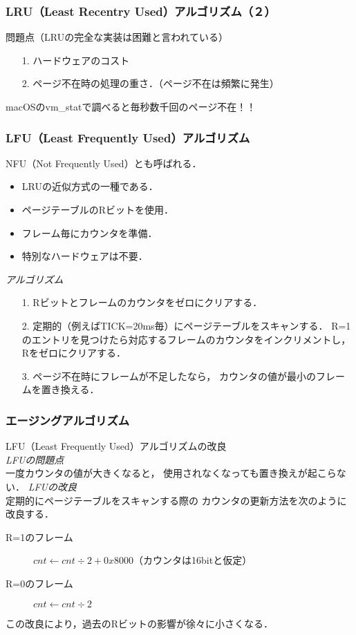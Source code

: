 \documentclass{beamer}                   %
\begin{document}
\begin{frame}
  \frametitle{LRU（Least Recentry Used）アルゴリズム（２）}
  問題点（LRUの完全な実装は困難と言われている）\\
  \begin{enumerate}
  \item[1.] ハードウェアのコスト
  \item[2.] ページ不在時の処理の重さ．（ページ不在は頻繁に発生）
  \end{enumerate}
  macOSのvm\_statで調べると毎秒数千回のページ不在！！
\end{frame}

\begin{frame}
  \frametitle{LFU（Least Frequently Used）アルゴリズム}
  NFU（Not Frequently Used）とも呼ばれる．
  \begin{itemize}
  \item LRUの近似方式の一種である．
  \item ページテーブルのRビットを使用．
  \item フレーム毎にカウンタを準備．
  \item 特別なハードウェアは不要．
  \end{itemize}
  \vfill
  \emph{アルゴリズム}
  \begin{enumerate}
  \item[1.] Rビットとフレームのカウンタをゼロにクリアする．
  \item[2.] 定期的（例えばTICK=20ms毎）にページテーブルをスキャンする．
    R=1のエントリを見つけたら対応するフレームのカウンタをインクリメントし，
    Rをゼロにクリアする．
  \item[3.] ページ不在時にフレームが不足したなら，
    カウンタの値が最小のフレームを置き換える．
  \end{enumerate}
\end{frame}

\begin{frame}
  \frametitle{エージングアルゴリズム}
  LFU（Least Frequently Used）アルゴリズムの改良\\
  \vfill
  \emph{LFUの問題点}\\
  一度カウンタの値が大きくなると，
  使用されなくなっても置き換えが起こらない．
  \vfill
  \emph{LFUの改良}\\
  定期的にページテーブルをスキャンする際の
  カウンタの更新方法を次のように改良する．
  \begin{description}
  \item[R=1のフレーム]
    $cnt \leftarrow cnt \div 2 + 0x8000$（カウンタは16bitと仮定）
  \item[R=0のフレーム]
    $cnt \leftarrow cnt \div 2$
  \end{description}
  この改良により，過去のRビットの影響が徐々に小さくなる．
\end{frame}
\end{document}
